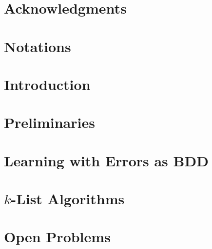 \documentclass[a4paper,twoside,table,10pt,openright]{mythesis}
\begin{document}


\hypersetup{linkcolor = black, breaklinks=true}

\thispagestyle{empty} %

\clearpage

\thispagestyle{empty}


\chapter*{Acknowledgments}


%

\tableofcontents

\chapter*{Notations}


\chapter{Introduction}
\pagestyle{normal}

\label{chap:Intro}
\clearpage


\chapter{Preliminaries}
\label{chap:Prelim}
\pagestyle{normal}

\clearpage

\chapter{Learning with Errors as BDD}
\label{chap:LWEasBDD}
\pagestyle{special}




\chapter{$k$-List Algorithms}
\label{chap:kList}
\pagestyle{special}



\chapter*{Open Problems}








\def\shortbib{1}


%



\end{document}
